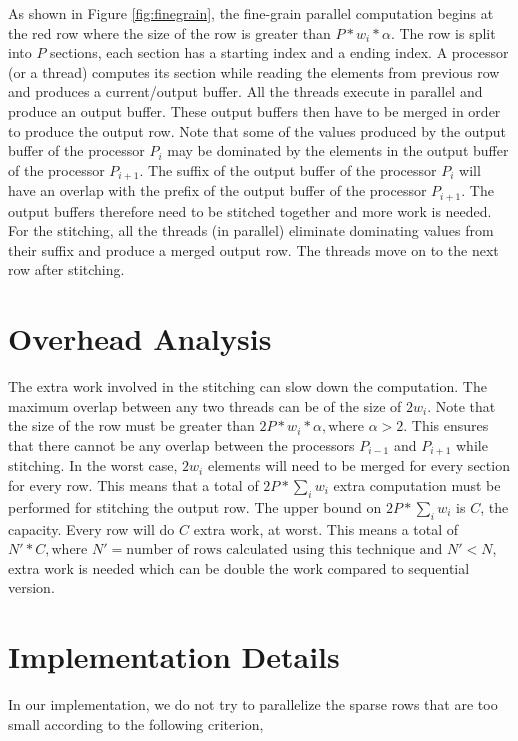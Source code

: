 As shown in Figure \ref{fig:finegrain},  the fine-grain parallel computation begins at the red row where the size of the row is greater than $P*w_{i}*\alpha$.  The  row is split into $P$ sections, each section has a starting index and a ending index.  A processor (or a thread) computes its section while reading the elements from previous row and produces a current/output buffer.  All the threads execute in parallel and produce an output buffer.  These output buffers then have to be merged in order to produce the output row.  Note that some of the values produced by the output buffer of the processor $P_i$ may be dominated by the elements in the output buffer of the processor $P_{i+1}$. The suffix of the output buffer of the processor $P_i$ will have an overlap with the prefix of the output buffer of the processor $P_{i+1}$.  The output buffers therefore need to be stitched together and more work is needed.  For the stitching, all the threads (in parallel) eliminate dominating values from their suffix and produce a merged output row.  The threads move on to the next row after stitching.

\section{Overhead Analysis} 
The extra work involved in the stitching can slow down the computation.  The maximum overlap between any two threads can be of the size of $2w_i$. Note that the size of the row must be greater than $2P*w_{i}*\alpha,\text{where } \alpha>2$.  This ensures that there cannot be any overlap between the processors $P_{i-1}$ and $P_{i+1}$ while stitching.  In the worst case, $2w_i$ elements will need to be merged for every section for every row.  This means that a total of $2P* \sum_i w_i$ extra computation must be performed for stitching the output row.  The upper bound on $2P* \sum_i w_i$ is $C$, the capacity.  Every row will do $C$ extra work, at worst.  This means a total of $N'*C, \text{where } N'=\text{number of rows calculated using this technique and } N' < N$, extra work is needed which can be double the work compared to sequential version.



\section{Implementation Details} 
In our implementation, we do not try to parallelize the sparse rows that are too small according to the following criterion,

